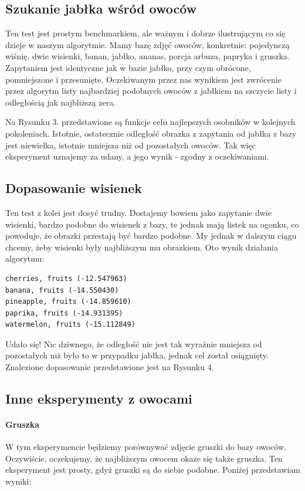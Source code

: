 \documentclass[a4paper,12pt,leqno]{article}
\begin{document}
\subsection{Szukanie jabłka wśród owoców}
Ten test jest prostym benchmarkiem, ale ważnym i dobrze ilustrującym co się dzieje w naszym algorytmie. Mamy bazę zdjęć owoców, konkretnie: 
pojedynczą wiśnię, dwie wisienki, banan, jabłko, ananas, porcja arbuza, papryka i gruszka. Zapytaniem jest identyczne jak w bazie jabłko, przy czym obrócone, pomniejszone i przesunięte.
Oczekiwanym przez nas wynikiem jest zwrócenie przez algorytm listy najbardziej podobnych owoców z jabłkiem na szczycie listy i odległością jak najbliższą zera.

Na Rysunku 3. przedstawione są funkcje celu najlepszych osobników w kolejnych pokoleniach. Istotnie, ostatecznie odległość obrazka z zapytania od jabłka z bazy jest niewielka, 
istotnie mniejsza niż od pozostałych owoców. Tak więc eksperyment uznajemy za udany, a jego wynik - zgodny z oczekiwaniami.

\subsection{Dopasowanie wisienek}
Ten test z kolei jest dosyć trudny. Dostajemy bowiem jako zapytanie dwie wisienki, bardzo podobne do wisienek z bazy, te jednak mają listek na ogonku, co powoduje,
że obrazki przestają być bardzo podobne. My jednak w dalszym ciągu chcemy, żeby wisienki były najbliższym mu obrazkiem. Oto wynik działania algorytmu:
\begin{verbatim}
cherries, fruits (-12.547963)
banana, fruits (-14.550430)
pineapple, fruits (-14.859610)
paprika, fruits (-14.931395)
watermelon, fruits (-15.112849)
\end{verbatim}
Udało się! Nic dziwnego, że odległość nie jest tak wyraźnie mniejsza od pozostałych niż było to w przypadku jabłka, jednak cel został osiągnięty. 
Znalezione dopasowanie przedstawione jest na Rysunku 4.

\subsection{Inne eksperymenty z owocami}

\paragraph{Gruszka}
W tym eksperymencie będziemy porównywać zdjęcie gruszki do bazy owoców. Oczywiście, oczekujemy, że najbliższym owocem okaże się także gruszka.
Ten eksperyment jest prosty, gdyż gruszki są do siebie podobne.
Poniżej przedstawiam wyniki:
\end{document}
